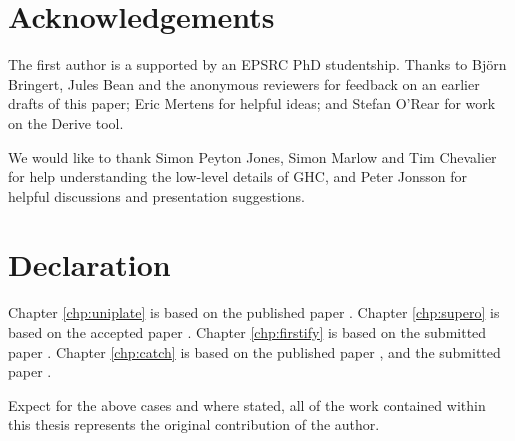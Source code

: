 \tableofcontents
\listoffigures
\listoftables

\chapter*{Acknowledgements}


The first author is a supported by an EPSRC PhD studentship. Thanks to Bj\"{o}rn Bringert, Jules Bean and the anonymous reviewers for feedback on an earlier drafts of this paper; Eric Mertens for helpful ideas; and Stefan O'Rear for work on the Derive tool.

We would like to thank Simon Peyton Jones, Simon Marlow and Tim Chevalier for help understanding the low-level details of GHC, and Peter Jonsson for helpful discussions and presentation suggestions.


\chapter*{Declaration}

Chapter \ref{chp:uniplate} is based on the published paper \cite{me:uniplate}. Chapter \ref{chp:supero} is based on the accepted paper \cite{me:supero}. Chapter \ref{chp:firstify} is based on the submitted paper \cite{me:firstify}. Chapter \ref{chp:catch} is based on the published paper \cite{me:catch_tfp}, and the submitted paper \cite{me:catch_icfp}.

Expect for the above cases and where stated, all of the work contained within this thesis represents the original contribution of the author.
